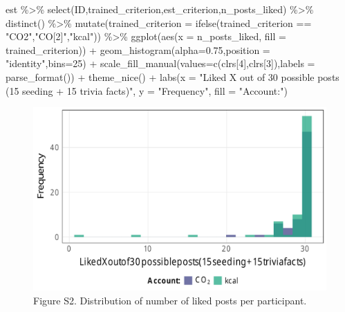 \documentclass[
  letterpaper,
  DIV=11,
  numbers=noendperiod]{scrartcl}
\newenvironment{Shaded}{\begin{snugshade}}{\end{snugshade}}
\newcommand{\AttributeTok}[1]{\textcolor[rgb]{0.40,0.45,0.13}{#1}}
\newcommand{\DecValTok}[1]{\textcolor[rgb]{0.68,0.00,0.00}{#1}}
\newcommand{\FloatTok}[1]{\textcolor[rgb]{0.68,0.00,0.00}{#1}}
\newcommand{\FunctionTok}[1]{\textcolor[rgb]{0.28,0.35,0.67}{#1}}
\newcommand{\NormalTok}[1]{\textcolor[rgb]{0.00,0.23,0.31}{#1}}
\newcommand{\SpecialCharTok}[1]{\textcolor[rgb]{0.37,0.37,0.37}{#1}}
\newcommand{\StringTok}[1]{\textcolor[rgb]{0.13,0.47,0.30}{#1}}
\begin{document}
\begin{Shaded}
\begin{Highlighting}[]
\NormalTok{est }\SpecialCharTok{\%\textgreater{}\%} 
  \FunctionTok{select}\NormalTok{(ID,trained\_criterion,est\_criterion,n\_posts\_liked) }\SpecialCharTok{\%\textgreater{}\%} 
  \FunctionTok{distinct}\NormalTok{() }\SpecialCharTok{\%\textgreater{}\%} 
  \FunctionTok{mutate}\NormalTok{(}\AttributeTok{trained\_criterion =} \FunctionTok{ifelse}\NormalTok{(trained\_criterion  }\SpecialCharTok{==} \StringTok{"CO2"}\NormalTok{,}\StringTok{"CO[2]"}\NormalTok{,}\StringTok{"kcal"}\NormalTok{)) }\SpecialCharTok{\%\textgreater{}\%} 
  \FunctionTok{ggplot}\NormalTok{(}\FunctionTok{aes}\NormalTok{(}\AttributeTok{x =}\NormalTok{ n\_posts\_liked,  }\AttributeTok{fill =}\NormalTok{ trained\_criterion)) }\SpecialCharTok{+}
    \FunctionTok{geom\_histogram}\NormalTok{(}\AttributeTok{alpha=}\FloatTok{0.75}\NormalTok{,}\AttributeTok{position =} \StringTok{"identity"}\NormalTok{,}\AttributeTok{bins=}\DecValTok{25}\NormalTok{) }\SpecialCharTok{+}
    \FunctionTok{scale\_fill\_manual}\NormalTok{(}\AttributeTok{values=}\FunctionTok{c}\NormalTok{(clrs[}\DecValTok{4}\NormalTok{],clrs[}\DecValTok{3}\NormalTok{]),}\AttributeTok{labels =} \FunctionTok{parse\_format}\NormalTok{()) }\SpecialCharTok{+}
    \FunctionTok{theme\_nice}\NormalTok{() }\SpecialCharTok{+}
    \FunctionTok{labs}\NormalTok{(}\AttributeTok{x    =} \StringTok{"Liked X out of 30 possible posts (15 seeding + 15 trivia facts)"}\NormalTok{,}
         \AttributeTok{y    =} \StringTok{"Frequency"}\NormalTok{,}
         \AttributeTok{fill =} \StringTok{"Account:"}\NormalTok{)}
\end{Highlighting}
\end{Shaded}

\begin{figure}[H]

{\centering \includegraphics{supplement_files/figure-pdf/unnamed-chunk-5-1.pdf}

}

\caption{Figure S2. Distribution of number of liked posts per
participant.}

\end{figure}%
\end{document}
